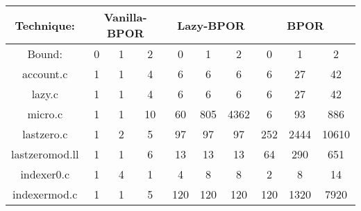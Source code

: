 \begin{center}
\begin{tabular}{ |c|c|c|c|c|c|c|c|c|c|}
\hline
\multicolumn{1}{|c|}{Technique:} & \multicolumn{3}{c|}{Vanilla-BPOR} & \multicolumn{3}{c|}{Lazy-BPOR} & \multicolumn{3}{c|}{BPOR} \\
\hline
Bound: & 0 & 1 & 2 & 0 & 1 & 2 & 0 & 1 & 2 \\
\hline \hline
account.c & 1 & 1 & 4 & 6 & 6 & 6 & 6 & 27 & 42 \\
\hline
lazy.c & 1 & 1 & 4 & 6 & 6 & 6 & 6 & 27 & 42 \\
\hline
micro.c & 1 & 1 & 10 & 60 & 805 & 4362 & 6 & 93 & 886 \\
\hline
lastzero.c & 1 & 2 & 5 & 97 & 97 & 97 & 252 & 2444 & 10610 \\
\hline
lastzeromod.ll & 1 & 1 & 6 & 13 & 13 & 13 & 64 & 290 & 651 \\
\hline
indexer0.c & 1 & 4 & 1 & 4 & 8 & 8 & 2 & 8 & 14 \\
\hline
indexermod.c & 1 & 1 & 5 & 120 & 120 & 120 & 120 & 1320 & 7920 \\
\hline
\end{tabular}
\end{center}
